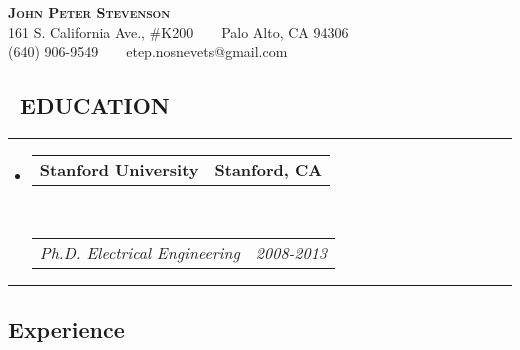 \documentclass[10pt,letterpaper]{article}
\makeatletter
\newcommand{\headerrow}[2]
{\begin{tabular*}{\linewidth}{l@{\extracolsep{\fill}}r}
	#1 &
	#2 \\
\end{tabular*}}
\makeatother
\begin{document}
\begin{center}
{\LARGE{\scshape \textbf{John Peter Stevenson}}} \\
\vspace{0.5em}
161 S. California Ave., \#K200\ \ \textbullet\ \ Palo Alto, CA 94306 \\
(640) 906-9549\ \ \textbullet \ \ etep.nosnevets@gmail.com
\end{center}

\subsection*{\ EDUCATION}
\vspace{-0.4em}
\hrule
\vspace{ 0.4em}
\begin{itemize}
	\parskip=0.1em

	\item[] 
	\headerrow {\textbf{Stanford University}} {\textbf{Stanford, CA}} \\
	\headerrow {\emph{Ph.D. Electrical Engineering}} {\emph{2008-2013}}

\end{itemize}

\hrule
\vspace{-0.4em}
\subsection*{Experience}
\end{document}
